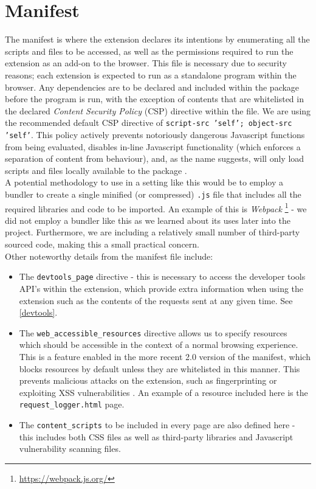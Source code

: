 \section{Manifest}

The manifest is where the extension declares its intentions by enumerating all the scripts and files to be accessed, as well as the permissions required to run the extension as an add-on to the browser. This file is necessary due to security reasons; each extension is expected to run as a standalone program within the browser. Any dependencies are to be declared and included within the package before the program is run, with the exception of contents that are whitelisted in the declared \textit{Content Security Policy} (CSP) directive within the file. We are using the recommended default CSP directive of \texttt{script-src 'self'; object-src 'self'}. This policy actively prevents notoriously dangerous Javascript functions from being evaluated, disables in-line Javascript functionality (which enforces a separation of content from behaviour), and, as the name suggests, will only load scripts and files locally available to the package \cite{chromeExtensionCSP}. \\ 

A potential methodology to use in a setting like this would be to employ a bundler to create a single minified (or compressed) \texttt{.js} file that includes all the required libraries and code to be imported. An example of this is  \textit{Webpack} \footnote{\url{https://webpack.js.org/}} - we did not employ a bundler like this as we learned about its uses later into the project. Furthermore, we are including a relatively small number of third-party sourced code, making this a small practical concern. \\

Other noteworthy details from the manifest file include:

\begin{itemize}
	\item The \texttt{devtools\_page} directive - this is necessary to access the developer tools API's within the extension, which provide extra information when using the extension such as the contents of the requests sent at any given time. See \ref{devtools}.
	
	\item The \texttt{web\_accessible\_resources} directive allows us to specify resources which should be accessible in the context of a normal browsing experience. This is a feature enabled in the more recent 2.0 version of the manifest, which blocks resources by default unless they are whitelisted in this manner. This prevents malicious attacks on the extension, such as fingerprinting or exploiting XSS vulnerabilities \cite{chromeExtensionWebAccessibleResources}. An example of a resource included here is the \texttt{request\_logger.html} page.
	
	\item The \texttt{content\_scripts} to be included in every page are also defined here - this includes both CSS files as well as third-party libraries and Javascript vulnerability scanning files.
\end{itemize}

